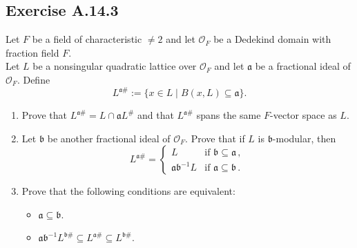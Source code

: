 \documentclass[12pt, a4paper]{article}
\begin{document}
\subsection*{Exercise A.14.3}
Let $F$ be a field of characteristic $\neq 2$ and let $\mathcal{O}_F$ be a Dedekind domain with fraction field $F$. \\
Let $L$ be a nonsingular quadratic lattice over $\mathcal{O}_F$ and let $\mathfrak{a}$ be a fractional ideal of $\mathcal{O}_F$. Define
\[ L^{\mathfrak{a}\#} := \{ x \in L \mid B(x, L) \subseteq \mathfrak{a} \}. \]
\begin{enumerate}
    \item Prove that $L^{\mathfrak{a}\#} = L \cap \mathfrak{a}L^\#$ and that $L^{\mathfrak{a}\#}$ spans the same $F$-vector space as $L$.
    \item Let $\mathfrak{b}$ be another fractional ideal of $\mathcal{O}_F$. Prove that if $L$ is $\mathfrak{b}$-modular, then
    \[ L^{\mathfrak{a}\#} = \begin{cases} L & \text{if } \mathfrak{b} \subseteq \mathfrak{a} \,, \\ \mathfrak{a}\mathfrak{b}^{-1}L & \text{if } \mathfrak{a} \subseteq \mathfrak{b} \,. \end{cases} \]
    \item Prove that the following conditions are equivalent:
    \begin{itemize}
        \item[(i)] $\mathfrak{a} \subseteq \mathfrak{b}$.
        \item[(ii)] $\mathfrak{a}\mathfrak{b}^{-1}L^{\mathfrak{b}\#} \subseteq L^{\mathfrak{a}\#} \subseteq L^{\mathfrak{b}\#}$.
    \end{itemize}
\end{enumerate}
\end{document}
